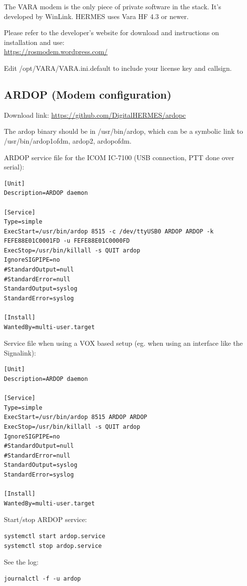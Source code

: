 \documentclass[11pt,a4paper]{article}
\begin{document}
The VARA modem is the only piece of private software in the stack.
It's developed by WinLink. HERMES uses Vara HF 4.3 or newer.

Please refer to the developer's website for download and instructions on installation and use: \\
\url{https://rosmodem.wordpress.com/}

Edit /opt/VARA/VARA.ini.default to include your license key and callsign.



\subsection{ARDOP (Modem configuration)}

Download link: \url{https://github.com/DigitalHERMES/ardopc}

The ardop binary should be in /usr/bin/ardop, which can be a
symbolic link to /usr/bin/{ardop1ofdm, ardop2, ardopofdm}.

ARDOP service file for the ICOM IC-7100 (USB connection, PTT done over serial):
\begin{verbatim}
[Unit]
Description=ARDOP daemon

[Service]
Type=simple
ExecStart=/usr/bin/ardop 8515 -c /dev/ttyUSB0 ARDOP ARDOP -k FEFE88E01C0001FD -u FEFE88E01C0000FD
ExecStop=/usr/bin/killall -s QUIT ardop
IgnoreSIGPIPE=no
#StandardOutput=null
#StandardError=null
StandardOutput=syslog
StandardError=syslog

[Install]
WantedBy=multi-user.target
\end{verbatim}

Service file when using a VOX based setup (eg. when using an interface like
the Signalink):
\begin{verbatim}
[Unit]
Description=ARDOP daemon

[Service]
Type=simple
ExecStart=/usr/bin/ardop 8515 ARDOP ARDOP
ExecStop=/usr/bin/killall -s QUIT ardop
IgnoreSIGPIPE=no
#StandardOutput=null
#StandardError=null
StandardOutput=syslog
StandardError=syslog

[Install]
WantedBy=multi-user.target
\end{verbatim}


Start/stop ARDOP service:
\begin{verbatim}
systemctl start ardop.service
systemctl stop ardop.service
\end{verbatim}


See the log:
\begin{verbatim}
journalctl -f -u ardop
\end{verbatim}
\end{document}
